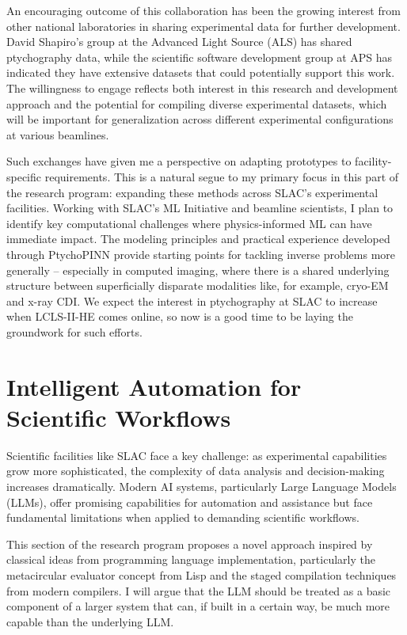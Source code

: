 \documentclass{article}
\begin{document}
An encouraging outcome of this collaboration has been the growing interest from other national laboratories in sharing experimental data for further development. David Shapiro's group at the Advanced Light Source (ALS) has shared ptychography data, while the scientific software development group at APS has indicated they have extensive datasets that could potentially support this work. The willingness to engage reflects both interest in this research and development approach and the potential for compiling diverse experimental datasets, which will be important for generalization across different experimental configurations at various beamlines.

Such exchanges have given me a perspective on adapting prototypes to facility-specific requirements. This is a natural segue to my primary focus in this part of the research program: expanding these methods across SLAC's experimental facilities. Working with SLAC's ML Initiative and beamline scientists, I plan to identify key computational challenges where physics-informed ML can have immediate impact. The modeling principles and practical experience developed through PtychoPINN provide starting points for tackling inverse problems more generally -- especially in computed imaging, where there is a shared underlying structure between superficially disparate modalities like, for example, cryo-EM and x-ray CDI. We expect the interest in ptychography at SLAC to increase when LCLS-II-HE comes online, so now is a good time to be laying the groundwork for such efforts. 

\section{Intelligent Automation for Scientific Workflows}
Scientific facilities like SLAC face a key challenge: as experimental capabilities grow more sophisticated, the complexity of data analysis and decision-making increases dramatically. Modern AI systems, particularly Large Language Models (LLMs), offer promising capabilities for automation and assistance but face fundamental limitations when applied to demanding scientific workflows.

This section of the research program proposes a novel approach inspired by classical ideas from programming language implementation, particularly the metacircular evaluator concept from Lisp and the staged compilation techniques from modern compilers. I will argue that the LLM should be treated as a basic component of a larger system that can, if built in a certain way, be much more capable than the underlying LLM. 
\end{document}
